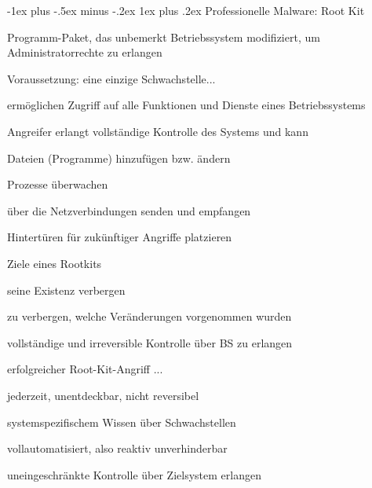 \documentclass[a4paper]{article}
\makeatletter
\renewcommand{\subsubsection}{\@startsection{subsubsection}{3}{0mm}%
 {-1ex plus -.5ex minus -.2ex}%
 {1ex plus .2ex}%
 {\normalfont\small\bfseries}}
\makeatother
\begin{document}
\begin{multicols}{3}
    \subsubsection{Professionelle Malware: Root  Kit}
    \begin{itemize*}
        \item Programm-Paket, das unbemerkt Betriebssystem modifiziert, um Administratorrechte zu erlangen
        \item Voraussetzung: eine einzige Schwachstelle...
        \item ermöglichen Zugriff auf alle Funktionen und Dienste eines Betriebssystems
        \item Angreifer erlangt vollständige Kontrolle des Systems und kann
        \begin{itemize*}
            \item Dateien (Programme) hinzufügen bzw. ändern
            \item Prozesse überwachen
            \item über die Netzverbindungen senden und empfangen
            \item Hintertüren für zukünftiger Angriffe platzieren
        \end{itemize*}
        \item Ziele eines Rootkits
        \begin{itemize*}
            \item seine Existenz verbergen
            \item zu verbergen, welche Veränderungen vorgenommen wurden
            \item vollständige und irreversible Kontrolle über BS zu erlangen
        \end{itemize*}
        \item erfolgreicher Root-Kit-Angriff ...
        \begin{itemize*}
            \item jederzeit, unentdeckbar, nicht reversibel
            \item systemspezifischem Wissen über Schwachstellen
            \item vollautomatisiert, also reaktiv unverhinderbar
            \item uneingeschränkte Kontrolle über Zielsystem erlangen
        \end{itemize*}
    \end{itemize*}


\end{multicols}
\end{document}
